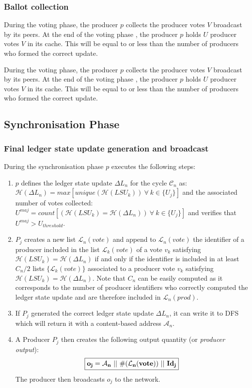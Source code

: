 \documentclass{article}
\begin{document}
\subsubsection{Ballot collection}
During the voting phase, the producer $p$ collects the producer votes $V$ broadcast by its peers. At the end of the voting phase , the producer $p$ holds $U$ producer votes $V$ in its cache. This will be equal to or less than the number of producers who formed the correct update.

During the voting phase, the producer $p$ collects the producer votes $V$ broadcast by its peers. At the end of the voting phase , the producer $p$ holds $U$ producer votes $V$ in its cache. This will be equal to or less than the number of producers who formed the correct update. 

\subsection{Synchronisation Phase}

\subsubsection{Final ledger state update generation and broadcast}



During the synchronisation phase $p$ executes the following steps:

\begin{enumerate}
\item $p$ defines the ledger state update $\Delta L_n$ for the cycle $\mathcal{C}_n$ as:\\
 $\mathcal{H}(\Delta L_n) = max[unique(\mathcal{H}(LSU_k))~\forall~k\in\{U_j\}]$ and the associated number of votes collected: $U^{maj} = count[(\mathcal{H}(LSU_k) = \mathcal{H}(\Delta L_n))~\forall~k\in\{U_j\}]$ and verifies that $U^{maj}> U_{threshold}$.
\item $P_j$ creates a new list $\mathcal{L}_{n}(vote)$ and append to $\mathcal{L}_{n}(vote)$ the identifier of a producer included in the list $\mathcal{L}_{k}(vote)$ of a vote $v_k$ satisfying $\mathcal{H}(LSU_k) = \mathcal{H}(\Delta L_n)$ if and only if the identifier is included in at least $C_n/2$ lists $\{\mathcal{L}_{k}(vote)\}$ associated to a producer vote $v_{k}$ satisfying $\mathcal{H}(LSU_k) = \mathcal{H}(\Delta L_n)$. Note that $C_n$ can be easily computed as it corresponds to the number of producer identifiers who correctly computed the ledger state update and are therefore included in $\mathcal{L}_{n}(prod)$.

\item If $P_j$ generated the correct ledger state update $\Delta L_n$, it can write it to DFS which will return it with a content-based address $\mathcal{A}_n$.
\item A Producer $P_j$ then creates the following output quantity (or \textit{producer output}):
\begin{equation}
\fbox{$\mathbf{o_{j} = \mathcal{A}_n~||~\#(\mathcal{L}_{n}(vote))~||~Id_j}$}
\label{eq:Hj}
\end{equation}
The producer then broadcasts $o_j$ to the network.
\end{enumerate}
\end{document}
